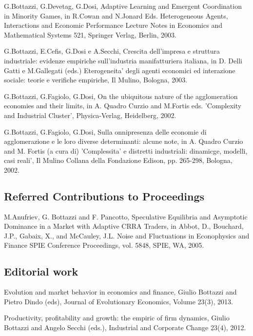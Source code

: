 \documentclass[a4paper]{article}
\begin{document}
G.Bottazzi, G.Devetag, G.Dosi, Adaptive Learning and Emergent
Coordination in Minority Games, in R.Cowan and N.Jonard Eds.
\textquotedbl{}Heterogeneous Agents, Interactions and Economic Performance\textquotedbl{} Lecture
Notes in Economics and Mathematical Systems 521, Springer Verlag,
Berlin, 2003.

G.Bottazzi, E.Cefis, G.Dosi e A.Secchi, Crescita dell'impresa e
struttura industriale: evidenze empiriche sull'industria
manifatturiera italiana, in D. Delli Gatti e M.Gallegati (eds.)
Eterogeneita' degli agenti economici ed interazione sociale: teorie e
verifiche empiriche, Il Mulino, Bologna, 2003.

G.Bottazzi, G.Fagiolo, G.Dosi, On the ubiquitous nature of the
agglomeration economies and their limits, in A. Quadro Curzio and
M.Fortis eds. 'Complexity and Industrial Cluster', Physica-Verlag,
Heidelberg, 2002.

G.Bottazzi, G.Fagiolo, G.Dosi, Sulla onnipresenza delle economie di
agglomerazione e le loro diverse determinanti: alcune note, in A.
Quadro Curzio and M. Fortis (a cura di) 'Complessita' e distretti
industriali: dinamicge, modelli, casi reali', Il Mulino Collana della
Fondazione Edison, pp. 265-298, Bologna, 2002.


\subsection{Referred Contributions to Proceedings%
  \label{referred-contributions-to-proceedings}%
}

M.Anufriev, G. Bottazzi and F. Pancotto, Speculative Equilibria and
Asymptotic Dominance in a Market with Adaptive CRRA Traders, in Abbot,
D., Bouchard, J.P., Gabaix, X., and McCauley, J.L. \textquotedbl{}Noise and
Fluctuations in Econophysics and Finance\textquotedbl{} SPIE Conference Proceedings,
vol. 5848, SPIE, WA, 2005.


\subsection{Editorial work%
  \label{editorial-work}%
}

Evolution and market behavior in economics and finance, Giulio
Bottazzi and Pietro Dindo (eds), Journal of Evolutionary Economics,
Volume 23(3), 2013.

Productivity, profitability and growth: the empiric of firm dynamics,
Giulio Bottazzi and Angelo Secchi (eds.), Industrial and Corporate
Change 23(4), 2012.
\end{document}
